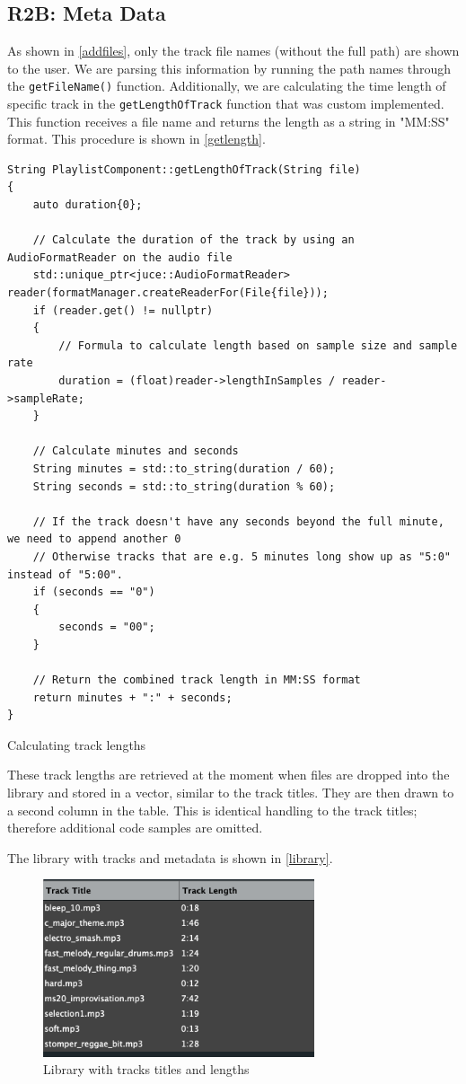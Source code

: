 \subsection{R2B: Meta Data}
As shown in \autoref{addfiles}, only the track file names (without the full path) are shown to the user. We are parsing this information by running the path names through the \texttt{getFileName()} function. Additionally, we are calculating the time length of specific track in the \texttt{getLengthOfTrack} function that was custom implemented. This function receives a file name and returns the length as a string in "MM:SS" format. This procedure is shown in \autoref{getlength}.

\begin{listing}[H]
	\begin{verbatim}
String PlaylistComponent::getLengthOfTrack(String file)
{
	auto duration{0};

	// Calculate the duration of the track by using an AudioFormatReader on the audio file
	std::unique_ptr<juce::AudioFormatReader> reader(formatManager.createReaderFor(File{file}));
	if (reader.get() != nullptr)
	{
		// Formula to calculate length based on sample size and sample rate
		duration = (float)reader->lengthInSamples / reader->sampleRate;
	}

	// Calculate minutes and seconds
	String minutes = std::to_string(duration / 60);
	String seconds = std::to_string(duration % 60);

	// If the track doesn't have any seconds beyond the full minute, we need to append another 0
	// Otherwise tracks that are e.g. 5 minutes long show up as "5:0" instead of "5:00".
	if (seconds == "0")
	{
		seconds = "00";
	}

	// Return the combined track length in MM:SS format
	return minutes + ":" + seconds;
}
	\end{verbatim}
	\caption{Calculating track lengths}
	\label{getlength}
\end{listing}

These track lengths are retrieved at the moment when files are dropped into the library and stored in a vector, similar to the track titles. They are then drawn to a second column in the table. This is identical handling to the track titles; therefore additional code samples are omitted.

The library with tracks and metadata is shown in \autoref{library}.

\begin{figure}
	\centering
	\includegraphics[width=8cm]{library.png}
	\caption{Library with tracks titles and lengths}
	\label{library}
\end{figure}

